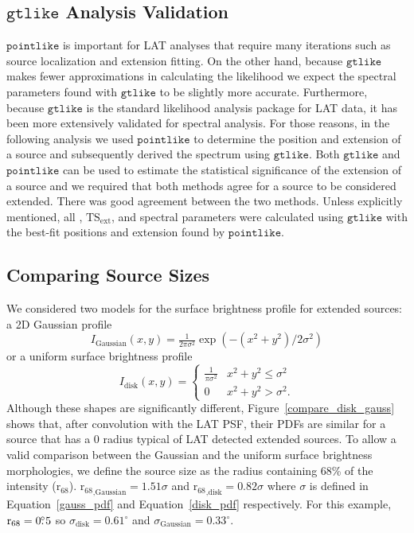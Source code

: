 \documentclass[12pt,preprint]{aastex}
\newcommand{\tsext}{{\ensuremath{\text{TS}_{\text{ext}}}}\xspace}
\newcommand{\rsixeight}{{\ensuremath{\text{r}_{68}}}\xspace}
\newcommand{\ts}{\text{TS}\xspace}
\newcommand{\gtlike}{\ensuremath{\mathtt{gtlike}}\xspace}
\newcommand{\pointlike}{\ensuremath{\mathtt{pointlike}}\xspace}
\newcommand{\degree}{^\circ\xspace}
\begin{document}
\subsection{\gtlike Analysis Validation}
\label{gtlike_crosscheck}

\pointlike is important for LAT analyses that require many iterations
such as source localization and extension fitting.  On the other hand,
because \gtlike makes fewer approximations in calculating the likelihood
we expect the spectral parameters found with \gtlike to be slightly more
accurate.  Furthermore, because \gtlike is the 
standard likelihood analysis package for LAT data, 
it has been more extensively validated for spectral analysis.
For those reasons, in the following analysis we used \pointlike to
determine the position and extension of a source and subsequently derived
the spectrum using \gtlike. Both \gtlike and \pointlike can be used to
estimate the statistical significance of the extension of a source and we
required that both methods agree for a source to be considered extended.
There was good agreement between the two methods.  Unless explicitly
mentioned, all \ts, \tsext, and spectral parameters were calculated using
\gtlike with the best-fit positions and extension found by \pointlike.


\subsection{Comparing Source Sizes}

\label{compare_source_size}

We considered two models for the
surface brightness profile for extended sources: a 2D Gaussian
profile
\begin{equation}\label{gauss_pdf}
  I_\text{Gaussian}(x,y)=\tfrac{1}{2\pi\sigma^2}\exp\left(-(x^2+y^2)/2\sigma^2\right)
\end{equation}
or a uniform surface brightness profile
\begin{equation}\label{disk_pdf}
  I_\text{disk}(x,y)=
  \begin{cases}
    \frac{1}{\pi\sigma^2} & x^2+y^2\le\sigma^2 \\
    0                      & x^2+y^2>\sigma^2.
  \end{cases}
\end{equation}
Although these shapes are significantly different,
Figure~\ref{compare_disk_gauss} shows that, after convolution with the
LAT PSF, their PDFs are similar for a source that has a 0 radius
typical of LAT detected extended sources.  To allow a valid comparison
between the Gaussian and the uniform surface brightness morphologies,
we define the source size as the radius containing 68\% of the
intensity ($\rsixeight$).  $\rsixeight_\text{,Gaussian}=1.51\sigma$
and $\rsixeight_\text{,disk}=0.82\sigma$ where $\sigma$ is defined
in Equation~\ref{gauss_pdf} and Equation~\ref{disk_pdf} respectively.
For this example, $\rsixeight=0\fdg5$ so $\sigma_\text{disk}=0.61\degree$
and $\sigma_\text{Gaussian}=0.33\degree$.
\end{document}
